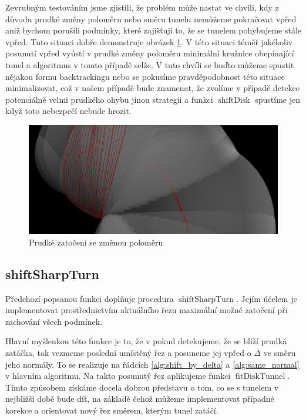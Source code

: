 Zevrubným testováním jsme zjistili, že problém může nastat ve chvíli, kdy
z důvodu prudké změny poloměru nebo směru tunelu nemůžeme pokračovat vpřed aniž
bychom porušili podmínky, které zajišťují to, že se tunelem pohybujeme stále vpřed.
Tuto situaci dobře demonstruje obrázek \ref{fig:sharp_curve}. V této situaci
téměř jakékoliv posunutí vpřed vyústí v prudké změny poloměru minimální kružnice
obepínající tunel a algoritmus v tomto případě selže. V tuto chvíli se buďto
můžeme spustit nějakou formu backtrackingu nebo se pokusíme pravděpodobnost
této situace minimalizovat, což v našem případě bude znamenat, že zvolíme v případě
detekce potenciálně velmi prudkého ohybu jinou strategii a funkci
$ \operatorname{shiftDisk} $ spustíme jen když toto nebezpečí nebude hrozit.

\begin{figure}[ht]
    \centering
    \includegraphics[width=\textwidth]{img/sharp_curve.png}
    \caption{Prudké zatočení se změnou poloměru}
  \centering
  \label{fig:sharp_curve}
\end{figure}





\subsection{shiftSharpTurn} \label{subsec:shift_sharp_turn}
Předchozí popsanou funkci doplňuje procedura $ \operatorname{shiftSharpTurn} $.
Jejím účelem je implementovat prostřednictvím aktuálního řezu maximální možné
zatočení při zachování všech podmínek.

Hlavní myšlenkou této funkce je to, že v pokud detekujeme, že se blíží prudká
zatáčka, tak vezmeme poslední umístěný řez a posuneme jej vpřed o $ \Delta $ ve směru
jeho normály. To se realizuje na řádcích \ref{alg:shift_by_delta} a
\ref{alg:same_normal} v hlavním algoritmu. Na takto posunutý řez aplikujeme
funkci $ \operatorname{fitDiskTunnel} $. Tímto způsobem získáme docela dobrou
představu o tom, co se s tunelem v nejbližší době bude dít, na základě čehož
můžeme implementovat případné korekce a orientovat nový řez směrem, kterým
tunel zatáčí.

